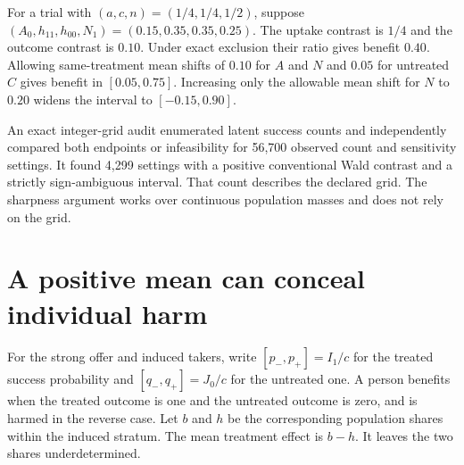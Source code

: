 \documentclass[11pt]{article}
\begin{document}
For a trial with $(a,c,n)=(1/4,1/4,1/2)$, suppose
$(A_0,h_{11},h_{00},N_1)=(0.15,0.35,0.35,0.25)$.
The uptake contrast is $1/4$ and the outcome contrast is $0.10$.
Under exact exclusion their ratio gives benefit $0.40$.
Allowing same-treatment mean shifts of $0.10$ for $A$ and $N$
and $0.05$ for untreated $C$ gives benefit in $[0.05,0.75]$.
Increasing only the allowable mean shift for $N$ to $0.20$
widens the interval to $[-0.15,0.90]$.

An exact integer-grid audit enumerated latent success counts
and independently compared both endpoints or infeasibility for
56,700 observed count and sensitivity settings. It found 4,299
settings with a positive conventional Wald contrast and a
strictly sign-ambiguous interval. That count describes the
declared grid. The sharpness argument works over continuous
population masses and does not rely on the grid.

\section{A positive mean can conceal individual harm}
For the strong offer and induced takers, write $[p_-,p_+]=I_1/c$
for the treated success probability and $[q_-,q_+]=J_0/c$
for the untreated one. A person benefits when the treated outcome
is one and the untreated outcome is zero, and is harmed in the
reverse case. Let $b$ and $h$ be the corresponding population shares
within the induced stratum. The mean treatment effect is $b-h$.
It leaves the two shares underdetermined.
\end{document}
